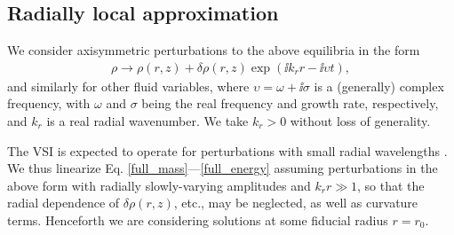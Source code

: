 \subsection{Radially local approximation}
We consider axisymmetric perturbations to the above equilibria in the
form 
\begin{align}
  \rho \to \rho(r, z) + \delta\rho(r,z)\exp{\left(\ii k_rr - \ii\upsilon
      t\right)},    
\end{align}
and similarly for other fluid variables, where $\upsilon = \omega + \ii
\sigma$ is a (generally) complex frequency, with $\omega$ and $\sigma$ being
the real frequency and growth rate, respectively, and $k_r$ is a real 
radial wavenumber. We take $k_r>0$ without loss of generality. 

The VSI is expected to operate for perturbations with small radial
wavelengths . We thus linearize 
Eq. \ref{full_mass}---\ref{full_energy} assuming perturbations 
in the above form with radially slowly-varying
amplitudes and $k_r r \gg 1$, so that the radial dependence of $\delta\rho(r,z)$, etc.,
may be neglected, as well as curvature terms. Henceforth we are
considering solutions at some fiducial radius $r=r_0$.  

